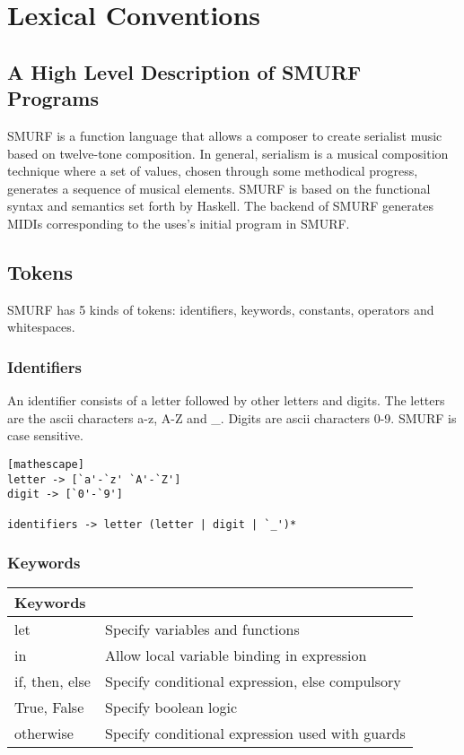 \section{Lexical Conventions}
\subsection{A High Level Description of SMURF Programs}
SMURF is a function language that allows a composer to create serialist music
based on twelve-tone composition. In general, serialism is a musical composition
technique where a set of values, chosen through some methodical progress,
          generates a sequence of musical elements. SMURF is based on the
          functional syntax and semantics set forth by Haskell. The backend of
          SMURF generates MIDIs corresponding to the uses's initial program in
          SMURF. 

\subsection{Tokens}
SMURF has 5 kinds of tokens: identifiers, keywords, constants, operators and whitespaces.

\subsubsection{Identifiers}
\label{sec:identifiers}
An identifier consists of a letter followed by other letters and
digits. The letters are the ascii characters a-z, A-Z and \_. Digits are ascii
characters 0-9. SMURF is case sensitive.
\begin{lstlisting}[frame=single][mathescape]
letter -> [`a'-`z' `A'-`Z']
digit -> [`0'-`9']

identifiers -> letter (letter | digit | `_')*
\end{lstlisting}

\subsubsection{Keywords}
\begin{table} [H]
	\centering
    \begin{tabular}{ll}
    \hline\hline
    Keywords & \\ 
    \hline\hline
      let & Specify variables and functions  \\ \hline
      in & Allow local variable binding in expression \\ \hline
      if, then, else & Specify conditional expression, else compulsory  \\ \hline
      True, False & Specify boolean logic \\ \hline
      otherwise & Specify conditional expression used with guards \\ \hline 
    \end{tabular}
\end{table}


